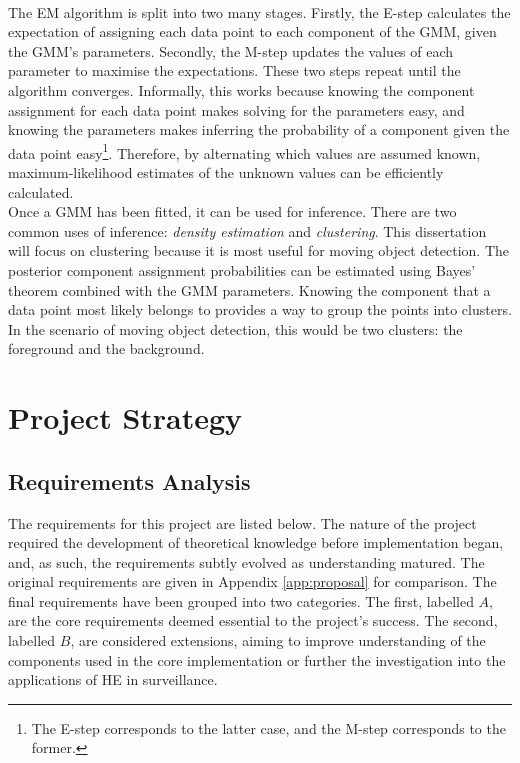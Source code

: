 \smallskip \\ \indent
The EM algorithm is split into two many stages. Firstly, the E-step calculates the expectation of assigning each data point to each component of the GMM, given the GMM's parameters. Secondly, the M-step updates the values of each parameter to maximise the expectations. These two steps repeat until the algorithm converges. Informally, this works because knowing the component assignment for each data point makes solving for the parameters easy, and knowing the parameters makes inferring the probability of a component given the data point easy\footnote{The E-step corresponds to the latter case, and the M-step corresponds to the former.}. Therefore, by alternating which values are assumed known, maximum-likelihood estimates of the unknown values can be efficiently calculated.
\smallskip \\ \indent
Once a GMM has been fitted, it can be used for inference. There are two common uses of inference: \textit{density estimation} and \textit{clustering}. This dissertation will focus on clustering because it is most useful for moving object detection. The posterior component assignment probabilities can be estimated using Bayes' theorem combined with the GMM parameters. Knowing the component that a data point most likely belongs to provides a way to group the points into clusters. In the scenario of moving object detection, this would be two clusters: the foreground and the background.

\setlength{\leftskip}{0cm}





\section{Project Strategy}
\label{sec:projectStrategy}

\subsection{Requirements Analysis}
\label{sec:requirements}
\setlength{\leftskip}{0.5cm}
\indent \indent
The requirements for this project are listed below. The nature of the project required the development of theoretical knowledge before implementation began, and, as such, the requirements subtly evolved as understanding matured. The original requirements are given in Appendix \ref{app:proposal} for comparison. The final requirements have been grouped into two categories. The first, labelled $A$, are the core requirements deemed essential to the project's success. The second, labelled $B$, are considered extensions, aiming to improve understanding of the components used in the core implementation or further the investigation into the applications of HE in surveillance.
